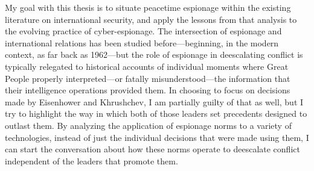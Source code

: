\documentclass{memoir}
\begin{document}

My goal with this thesis is to situate peacetime espionage within the existing literature on international security, and apply the lessons from that analysis to the evolving practice of cyber-espionage. The intersection of espionage and international relations has been studied before---beginning, in the modern context, as far back as 1962---but the role of espionage in deescalating conflict is typically relegated to historical accounts of individual moments where Great People properly interpreted---or fatally misunderstood---the information that their intelligence operations provided them. In choosing to focus on decisions made by Eisenhower and Khrushchev, I am partially guilty of that as well, but I try to highlight the way in which both of those leaders set precedents designed to outlast them. By analyzing the application of espionage norms to a variety of technologies, instead of just the individual decisions that were made using them, I can start the conversation about how these norms operate to deescalate conflict independent of the leaders that promote them.
\end{document}
